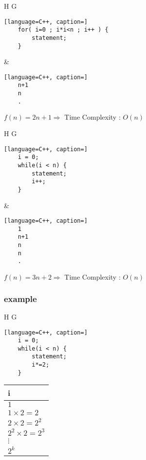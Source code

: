 \documentclass[12pt]{article}
\begin{document}
\begin{center}
  \bgroup
  \def\arraystretch{1.5}%
  \begin{tabular}{ H  G  }
	\begin{lstlisting}[language=C++, caption=]
	for( i=0 ; i*i<n ; i++ ) {
		statement;
	}
	\end{lstlisting}
     &  
	\begin{lstlisting}[language=C++, caption=]
	n+1 
	n
	.
	\end{lstlisting}
  \end{tabular}
  \egroup
\end{center}



$f(n) = 2n + 1 \Rightarrow$ Time Complexity : $O(n)$


\begin{center}
  \bgroup
  \def\arraystretch{1.5}%
  \begin{tabular}{ H  G  }
	\begin{lstlisting}[language=C++, caption=]
	i = 0;
	while(i < n) {
		statement;
		i++;
	}
	\end{lstlisting}
     &  
	\begin{lstlisting}[language=C++, caption=]
	1
	n+1
	n
	n
	.
	\end{lstlisting}
  \end{tabular}
  \egroup
\end{center}


$f(n) = 3n + 2 \Rightarrow$ Time Complexity : $O(n)$





\subsubsection{example}



\begin{center}
  \bgroup
  \def\arraystretch{1.5}%
  \begin{tabular}{ H  G  }
	\begin{lstlisting}[language=C++, caption=]
	i = 0;
	while(i < n) {
		statement;
		i*=2;
	}
	\end{lstlisting}
  \end{tabular}
  \egroup
\end{center}




\begin{center}
  \bgroup
  \def\arraystretch{1.5}%
  \begin{tabular}{ l  }
	i
     \\ \hline
     $1$
     \\
     $1 \times 2 = 2$
     \\
     $2 \times 2 = 2^{2}$
     \\
     $2^{2} \times 2 = 2^{3}$
     \\
     $\vdots$
     \\
     $2^{k}$
     \\
  \end{tabular}
  \egroup
\end{center}
\end{document}
